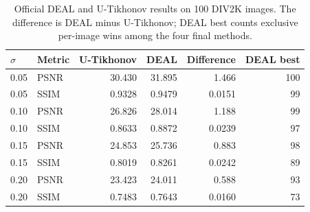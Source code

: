 \begin{table}[htbp]
\centering
\caption{Official DEAL and U-Tikhonov results on 100 DIV2K images. The difference is DEAL minus U-Tikhonov; DEAL best counts exclusive per-image wins among the four final methods.}
\label{tab:deal_comparison}
\begin{tabular}{llrrrr}
\toprule
$\sigma$ & Metric & U-Tikhonov & DEAL & Difference & DEAL best \\
\midrule
0.05 & PSNR & 30.430 & 31.895 & 1.466 & 100 \\
0.05 & SSIM & 0.9328 & 0.9479 & 0.0151 & 99 \\
0.10 & PSNR & 26.826 & 28.014 & 1.188 & 99 \\
0.10 & SSIM & 0.8633 & 0.8872 & 0.0239 & 97 \\
0.15 & PSNR & 24.853 & 25.736 & 0.883 & 98 \\
0.15 & SSIM & 0.8019 & 0.8261 & 0.0242 & 89 \\
0.20 & PSNR & 23.423 & 24.011 & 0.588 & 93 \\
0.20 & SSIM & 0.7483 & 0.7643 & 0.0160 & 73 \\
\bottomrule
\end{tabular}
\end{table}
